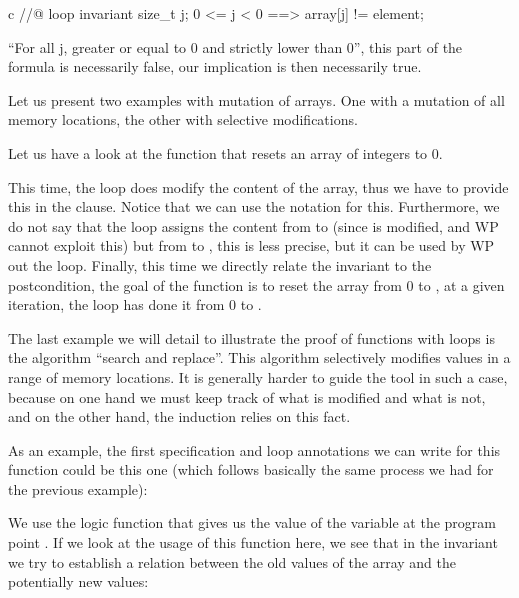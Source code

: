 \begin{CodeBlock}{c}
//@ loop invariant \forall size_t j; 0 <= j < 0 ==> array[j] != element;
\end{CodeBlock}


``For all j, greater or equal to 0 and strictly lower than 0'', this
part of the formula is necessarily false, our implication is then
necessarily true.




Let us present two examples with mutation of arrays. One with a mutation
of all memory locations, the other with selective modifications.




Let us have a look at the function that resets an array of integers to 0.




This time, the loop does modify the content of the array, thus we have to
provide this in the  clause. Notice that we can use
the notation  for this. Furthermore, we do not say that
the loop assigns the content from  to  (since
 is modified, and WP cannot exploit this) but from 
to , this is less precise, but it can be used by WP out the
loop. Finally, this time we directly relate the invariant to the postcondition,
the goal of the function is to reset the array from 0 to , at
a given iteration, the loop has done it from 0 to .


\label{l4:statements-loops-ex-search-and-replace}


The last example we will detail to illustrate the proof of functions
with loops is the algorithm ``search and replace''. This algorithm
selectively modifies values in a range of memory locations. It is
generally harder to guide the tool in such a case, because on one hand
we must keep track of what is modified and what is not, and on the other
hand, the induction relies on this fact.


As an example, the first specification and loop annotations we can write for
this function could be this one (which follows basically the same process we
had for the previous example):




We use the logic function  that gives
us the value of the variable  at the program point .
If we look at the usage of this function here, we see that in the
invariant we try to establish a relation between the old values of the
array and the potentially new values:


